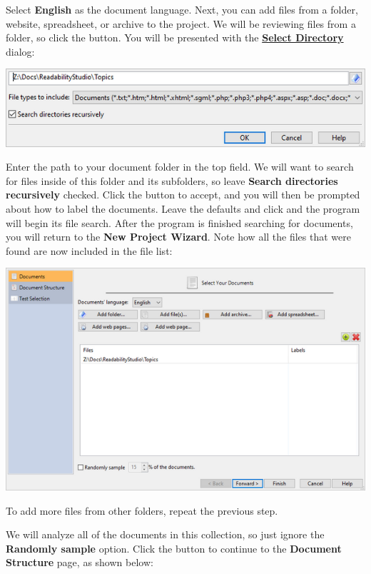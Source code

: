 \documentclass[
]{book}
\theoremstyle{definition}
\theoremstyle{definition}
\theoremstyle{definition}
\theoremstyle{definition}
\theoremstyle{remark}
\begin{document}
Select \textbf{English} as the document language. Next, you can add files from a folder, website, spreadsheet, or archive to the project. We will be reviewing files from a folder, so click the  button. You will be presented with the \protect\hyperlink{select-directory}{\textbf{Select Directory}} dialog:

\begin{center}\includegraphics[width=0.75\linewidth,]{Images/selectdirectory} \end{center}

Enter the path to your document folder in the top field. We will want to search for files inside of this folder and its subfolders, so leave \textbf{Search directories recursively} checked. Click the  button to accept, and you will then be prompted about how to label the documents. Leave the defaults and click  and the program will begin its file search. After the program is finished searching for documents, you will return to the \textbf{New Project Wizard}. Note how all the files that were found are now included in the file list:

\includegraphics{Images/wizardbatchselectfilesloaded.png}

To add more files from other folders, repeat the previous step.

We will analyze all of the documents in this collection, so just ignore the \textbf{Randomly sample} option. Click the  button to continue to the \textbf{Document Structure} page, as shown below:
\end{document}
